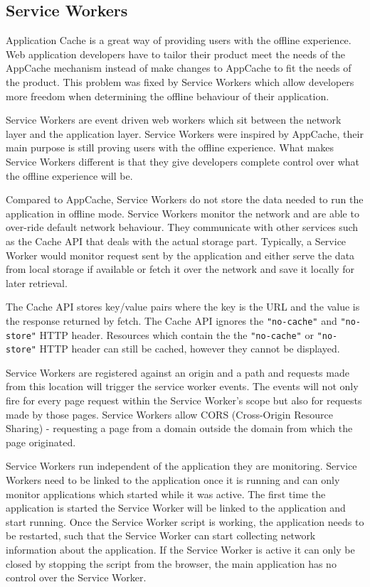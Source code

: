 \documentclass[10pt,a4paper,twoside]{book}
\begin{document}
\subsection{Service Workers}
Application Cache is a great way of providing users with the offline experience. Web application developers have to tailor their product meet the needs of the AppCache mechanism instead of make changes to AppCache to fit the needs of the product. This problem was fixed by Service Workers which allow developers more freedom when determining the offline behaviour of their application.

Service Workers are event driven web workers which sit between the network layer and the application layer. Service Workers were inspired by AppCache, their main purpose is still proving users with the offline experience. What makes Service Workers different is that they give developers complete control over what the offline experience will be. 

Compared to AppCache, Service Workers do not store the data needed to run the application in offline mode. Service Workers monitor the network and are able to over-ride default network behaviour. They communicate with other services such as the Cache API that deals with the actual storage part. Typically, a Service Worker would monitor request sent by the application and either serve the data from local storage if available or fetch it over the network and save it locally for later retrieval. 

The Cache API stores key/value pairs where the key is the URL and the value is the response returned by fetch. The Cache API ignores the \texttt{"no-cache"} and \texttt{"no-store"} HTTP header. Resources which contain the the \texttt{"no-cache"} or \texttt{"no-store"} HTTP header can still be cached, however they cannot be displayed. 

Service Workers are registered against an origin and a path and requests made from this location will trigger the service worker events. The events will not only fire for every page request within the Service Worker's scope but also for requests made by those pages. Service Workers allow CORS (Cross-Origin Resource Sharing) - requesting a page from a domain outside the domain from which the page originated.

Service Workers run independent of the application they are monitoring. Service Workers need to be linked to the application once it is running and can only monitor applications which started while it was active. The first time the application is started the Service Worker will be linked to the application and start running. Once the Service Worker script is working, the application needs to be restarted, such that the Service Worker can start collecting network information about the application. If the Service Worker is active it can only be closed by stopping the script from the browser, the main application has no control over the Service Worker.
\end{document}
